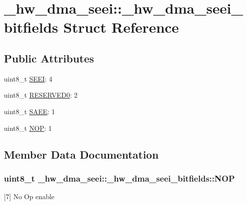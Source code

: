 \hypertarget{struct__hw__dma__seei_1_1__hw__dma__seei__bitfields}{}\section{\+\_\+hw\+\_\+dma\+\_\+seei\+:\+:\+\_\+hw\+\_\+dma\+\_\+seei\+\_\+bitfields Struct Reference}
\label{struct__hw__dma__seei_1_1__hw__dma__seei__bitfields}
\subsection*{Public Attributes}
\begin{DoxyCompactItemize}
\item 
uint8\+\_\+t \hyperlink{struct__hw__dma__seei_1_1__hw__dma__seei__bitfields_a03463ebe947d7f3bc5f5be9052600487}{S\+E\+EI}\+: 4
\item 
uint8\+\_\+t \hyperlink{struct__hw__dma__seei_1_1__hw__dma__seei__bitfields_aff9e40f1161180f3d5ec6abf25af08a8}{R\+E\+S\+E\+R\+V\+E\+D0}\+: 2
\item 
uint8\+\_\+t \hyperlink{struct__hw__dma__seei_1_1__hw__dma__seei__bitfields_a9789e77f2186fcf3f33080b93d2ac32d}{S\+A\+EE}\+: 1
\item 
uint8\+\_\+t \hyperlink{struct__hw__dma__seei_1_1__hw__dma__seei__bitfields_ae56a7c23f5552c3192a6ce6c7146c04f}{N\+OP}\+: 1
\end{DoxyCompactItemize}


\subsection{Member Data Documentation}
\subsubsection[{\texorpdfstring{N\+OP}{NOP}}]{\setlength{\rightskip}{0pt plus 5cm}uint8\+\_\+t \+\_\+hw\+\_\+dma\+\_\+seei\+::\+\_\+hw\+\_\+dma\+\_\+seei\+\_\+bitfields\+::\+N\+OP}\hypertarget{struct__hw__dma__seei_1_1__hw__dma__seei__bitfields_ae56a7c23f5552c3192a6ce6c7146c04f}{}\label{struct__hw__dma__seei_1_1__hw__dma__seei__bitfields_ae56a7c23f5552c3192a6ce6c7146c04f}
\mbox{[}7\mbox{]} No Op enable 
